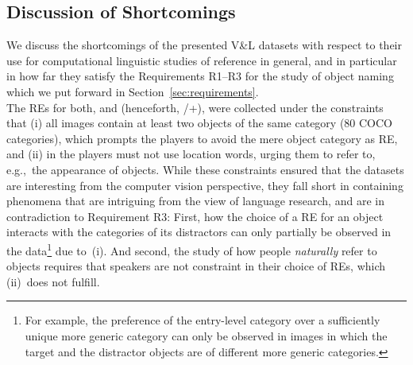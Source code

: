 {\iffalse 
5.4 Million Region Descriptions
1.7 Million Visual Question Answers
3.8 Million Object Instances
2.8 Million Attributes
2.3 Million Relationships
Everything Mapped to Wordnet Synsets
\fi

\subsection{Discussion of Shortcomings}
We discuss the shortcomings of the presented V\&L datasets with respect to their use for computational linguistic studies of reference in general, and in particular in how far they satisfy the Requirements R1--R3 for the study of object naming which we put forward in Section~\ref{sec:requirements}. \\

The REs for both, \textit{} and \textit{} (henceforth, /+), were collected under the constraints that (i) all images contain at least two objects of the same category (80 COCO categories), which prompts the players to avoid the mere object category as RE, and (ii) in  the players must not use location words, urging them to refer to, e.g.,~the appearance of objects. %
%
While these constraints ensured that the datasets are interesting from the computer vision perspective, they fall short in containing phenomena that are intriguing from the view of language research,    
%
and are in contradiction to Requirement R3:  
First, how the choice of a RE for an object interacts with the categories of its distractors can only partially be observed in the data\footnote{For example, the preference of the entry-level category over a sufficiently unique more generic category can only be observed in images in which the target and the distractor objects are of different more generic categories.} due to~(i). 
And second, the study of how people \textit{naturally} refer to objects requires that speakers are not constraint in their choice of REs, which (ii)~does not fulfill.

}
